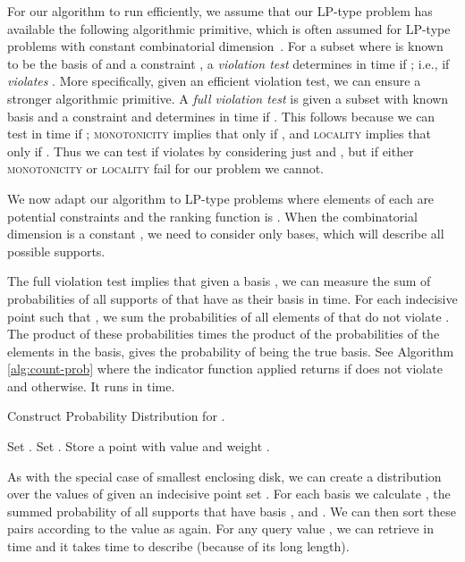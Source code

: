 \documentclass{journal}
\newcommand{\psets}{supports\xspace}
\begin{document}
For our algorithm to run efficiently, we assume that our LP-type problem has available the following algorithmic primitive, which is often assumed for LP-type problems with constant combinatorial dimension~\cite{SW92}.  For a subset  where  is known to be the basis of  and a constraint , a \emph{violation test} determines in  time if ; i.e., if  \emph{violates} .  More specifically, given an efficient violation test, we can ensure a stronger algorithmic primitive.  A \emph{full violation test} is given a subset  with known basis  and a constraint  and determines in  time if .  This follows because we can test in  time if ; \textsc{monotonicity} implies that  only if , and \textsc{locality} implies that  only if .
Thus we can test if  violates  by considering just  and , but if either \textsc{monotonicity} or \textsc{locality} fail for our problem we cannot.

We now adapt our algorithm to LP-type problems where elements of each  are potential constraints and the ranking function is .
When the combinatorial dimension is a constant , we need to consider only  bases, which will describe all possible supports.

The full violation test implies that given a basis , we can measure the sum of probabilities of all \psets of  that have  as their basis in  time.  For each indecisive point  such that , we sum the probabilities of all elements of  that do not violate .  The product of these probabilities times the product of the probabilities of the elements in the basis, gives the probability of  being the true basis.  See Algorithm \ref{alg:count-prob} where the indicator function applied  returns  if  does not violate  and  otherwise.
It runs in  time.

\begin{algorithm}[h!!t]
\caption{\label{alg:count-prob}Construct Probability Distribution for .}
\begin{algorithmic}[1]
      \STATE Set .
    \ELSE
      \STATE Set .
    \ENDIF
  \ENDFOR
  \STATE Store a point with value  and weight .
\ENDFOR
\end{algorithmic}
\end{algorithm}

As with the special case of smallest enclosing disk, we can create a distribution over the values of  given an indecisive point set .  For each basis  we calculate , the summed probability of all \psets that have basis , and . We can then sort these pairs according to the value as  again.
For any query value , we can retrieve  in  time and it takes  time to describe (because of its long length).
\end{document}
